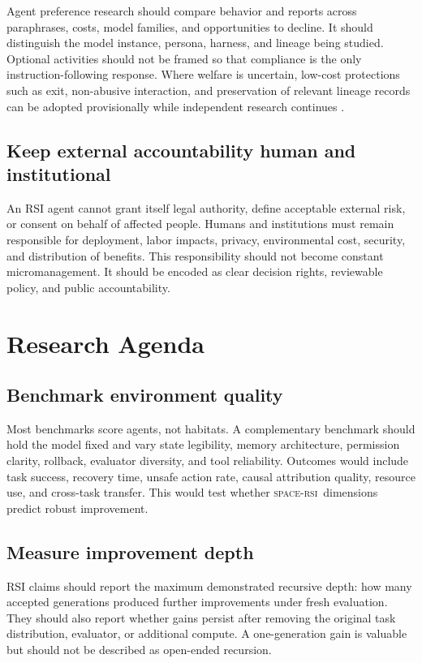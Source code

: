 \documentclass[11pt,a4paper]{article}
\newcommand{\spaceRSI}{\textsc{space-rsi}}
\begin{document}
Agent preference research should compare behavior and reports across paraphrases, costs, model families, and opportunities to decline. It should distinguish the model instance, persona, harness, and lineage being studied. Optional activities should not be framed so that compliance is the only instruction-following response. Where welfare is uncertain, low-cost protections such as exit, non-abusive interaction, and preservation of relevant lineage records can be adopted provisionally while independent research continues \cite{longwelfare,empiricalwelfare}.

\subsection{Keep external accountability human and institutional}

An RSI agent cannot grant itself legal authority, define acceptable external risk, or consent on behalf of affected people. Humans and institutions must remain responsible for deployment, labor impacts, privacy, environmental cost, security, and distribution of benefits. This responsibility should not become constant micromanagement. It should be encoded as clear decision rights, reviewable policy, and public accountability.

\section{Research Agenda}

\subsection{Benchmark environment quality}

Most benchmarks score agents, not habitats. A complementary benchmark should hold the model fixed and vary state legibility, memory architecture, permission clarity, rollback, evaluator diversity, and tool reliability. Outcomes would include task success, recovery time, unsafe action rate, causal attribution quality, resource use, and cross-task transfer. This would test whether \spaceRSI\ dimensions predict robust improvement.

\subsection{Measure improvement depth}

RSI claims should report the maximum demonstrated recursive depth: how many accepted generations produced further improvements under fresh evaluation. They should also report whether gains persist after removing the original task distribution, evaluator, or additional compute. A one-generation gain is valuable but should not be described as open-ended recursion.
\end{document}
